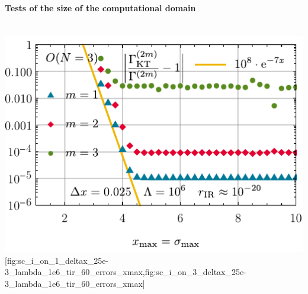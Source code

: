 \paragraph{Tests of the size of the computational domain}\label{paragraph:test_size_computational_domain}\mbox{}\\%
	{\includegraphics[width=\subcaptionFigureWidth]{0d/figures/sc_i_on_3_deltax_25e-3_lambda_1e6_tir_60_errors_xmax.pdf}}%
	[fig:sc_i_on_1_deltax_25e-3_lambda_1e6_tir_60_errors_xmax,fig:sc_i_on_3_deltax_25e-3_lambda_1e6_tir_60_errors_xmax] %
